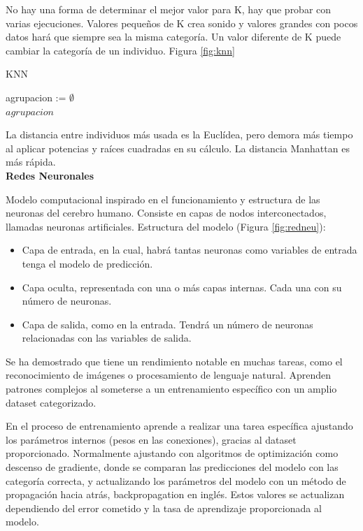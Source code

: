 No hay una forma de determinar el mejor valor para K, hay que probar con varias ejecuciones. Valores pequeños de K crea sonido y valores grandes con pocos datos hará que siempre sea la misma categoría. Un valor diferente de K puede cambiar la categoría de un individuo. Figura \ref{fig:knn}

\begin{algorithm}
	\caption{KNN}
	agrupacion := $\emptyset$\\
	\Return $agrupacion$\;
\end{algorithm}

La distancia entre individuos más usada es la Euclídea, pero demora más tiempo al aplicar potencias y raíces cuadradas en su cálculo. La distancia Manhattan es más rápida.\\


\noindent\textbf{Redes Neuronales}

Modelo computacional inspirado en el funcionamiento y estructura de las neuronas del cerebro humano. Consiste en capas de nodos interconectados, llamadas neuronas artificiales. Estructura del modelo (Figura \ref{fig:redneu}):


\begin{itemize}
	\item Capa de entrada, en la cual, habrá tantas neuronas como variables de entrada tenga el modelo de predicción.\\
	\item Capa oculta, representada con una o más capas internas. Cada una con su número de neuronas.\\	
	\item Capa de salida, como en la entrada. Tendrá un número de neuronas relacionadas con las variables de salida.
\end{itemize}

Se ha demostrado que tiene un rendimiento notable en muchas tareas, como el reconocimiento de imágenes o procesamiento de lenguaje natural. Aprenden patrones complejos al someterse a un entrenamiento específico con un amplio dataset categorizado.	

En el proceso de entrenamiento aprende a realizar una tarea específica ajustando los parámetros internos (pesos en las conexiones), gracias al dataset proporcionado. Normalmente ajustando con algoritmos de optimización como descenso de gradiente, donde se comparan las predicciones del modelo con las categoría correcta, y actualizando los parámetros del modelo con un método de propagación hacia atrás, backpropagation en inglés. Estos valores se actualizan dependiendo del error cometido y la tasa de aprendizaje proporcionada al modelo.



